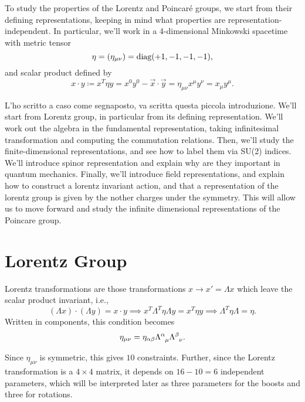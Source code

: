 To study the properties of the Lorentz and Poincaré groups, we start from their defining representations, keeping in mind what properties are representation-independent. In particular, we'll work in a 4-dimensional Minkowski spacetime with metric tensor 
\begin{equation}
    \eta = (\eta_{\mu\nu}) = \textup{diag}(+1,-1,-1,-1),
\end{equation}
and scalar product defined by
\begin{equation}
    x \cdot y \coloneq x^T \eta y = x^0y^0-\vec{x}\cdot\vec{y} = \eta_{\mu\nu} x^\mu y^\nu = x_\mu y^\mu .
\end{equation}

\color{red}L'ho scritto a caso come segnaposto, va scritta questa piccola introduzione. \color{blue}
We'll start from Lorentz group, in particular from its defining representation. We'll work out the algebra in the fundamental representation, taking infinitesimal transformation and computing the commutation relations. Then, we'll study the finite-dimensional representations, and see how to label them via SU(2) indices. We'll introduce spinor representation and explain why are they important in quantum mechanics. Finally, we'll introduce field representations, and explain how to construct a lorentz invariant action, and that a representation of the lorentz group is given by the nother charges under the symmetry. This will allow us to move forward and study the infinite dimensional representations of the Poincare group.
\color{black}


\section{Lorentz Group}\label{sec:lorentz-group}
Lorentz transformations are those transformations $x \to x' = \Lambda x$ which leave the scalar product invariant, i.e.,
\begin{equation}
    (\Lambda x) \cdot (\Lambda y) = x \cdot y \implies x^T \Lambda^T \eta \Lambda y = x^T \eta y \implies \Lambda^T \eta \Lambda = \eta .
\end{equation}
Written in components, this condition becomes
\begin{equation}\label{eq:lorentz-transf-def-components}
    \eta_{\mu\nu} = \eta_{\alpha\beta} \tensor{\Lambda}{^\alpha_\mu} \tensor{\Lambda}{^\beta_\nu}.
\end{equation}

Since $\eta_{\mu\nu}$ is symmetric, this gives $10$ constraints. Further, since the Lorentz transformation is a $4 \times 4$ matrix, it depends on $16-10 = 6$ independent parameters, which will be interpreted later as three parameters for the boosts and three for rotations. 

